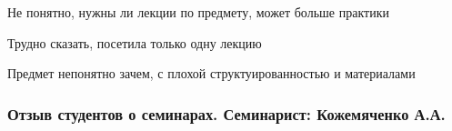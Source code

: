             \begin{commentbox} 
                Не понятно, нужны ли лекции по предмету, может больше практики 
            \end{commentbox} 
        
            \begin{commentbox} 
                Трудно сказать, посетила только одну лекцию 
            \end{commentbox} 
        
            \begin{commentbox} 
                Предмет непонятно зачем, с плохой структуированностью и материалами 
            \end{commentbox} 
    
    
    \subsubsection{Отзыв студентов о семинарах. Семинарист: Кожемяченко А.А.}
